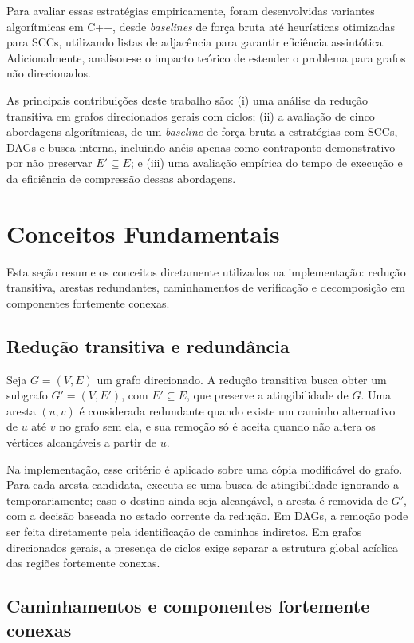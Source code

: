 \documentclass{sbc2023}%
\begin{document}
Para avaliar essas estratégias empiricamente, foram desenvolvidas variantes algorítmicas em C++, desde \textit{baselines} de força bruta até heurísticas otimizadas para SCCs, utilizando listas de adjacência para garantir eficiência assintótica. Adicionalmente, analisou-se o impacto teórico de estender o problema para grafos não direcionados.

As principais contribuições deste trabalho são: (i) uma análise da redução transitiva em grafos direcionados gerais com ciclos; (ii) a avaliação de cinco abordagens algorítmicas, de um \textit{baseline} de força bruta a estratégias com SCCs, DAGs e busca interna, incluindo anéis apenas como contraponto demonstrativo por não preservar $E' \subseteq E$; e (iii) uma avaliação empírica do tempo de execução e da eficiência de compressão dessas abordagens.

\section{Conceitos Fundamentais}

Esta seção resume os conceitos diretamente utilizados na implementação: redução transitiva, arestas redundantes, caminhamentos de verificação e decomposição em componentes fortemente conexas.

\subsection{Redução transitiva e redundância}

Seja $G=(V,E)$ um grafo direcionado. A redução transitiva busca obter um subgrafo $G'=(V,E')$, com $E' \subseteq E$, que preserve a atingibilidade de $G$. Uma aresta $(u,v)$ é considerada redundante quando existe um caminho alternativo de $u$ até $v$ no grafo sem ela, e sua remoção só é aceita quando não altera os vértices alcançáveis a partir de $u$.

Na implementação, esse critério é aplicado sobre uma cópia modificável do grafo. Para cada aresta candidata, executa-se uma busca de atingibilidade ignorando-a temporariamente; caso o destino ainda seja alcançável, a aresta é removida de $G'$, com a decisão baseada no estado corrente da redução. Em DAGs, a remoção pode ser feita diretamente pela identificação de caminhos indiretos. Em grafos direcionados gerais, a presença de ciclos exige separar a estrutura global acíclica das regiões fortemente conexas.

\subsection{Caminhamentos e componentes fortemente conexas}
\end{document}
